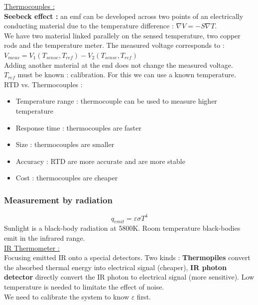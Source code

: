 \documentclass[../main.tex]{subfiles}
\begin{document}
\quad \underline{Thermocouples :}\\
\textbf{Seebeck effect :} an emf can be developed across two points of an electrically conducting material due to the temperature difference : $\nabla V = -S \nabla T$.\\
We have two material linked parallely on the sensed temperature, two copper rods and the temperature meter. The measured voltage corresponds to : $V_{meas} = V_1(T_{sense}, T_{ref}) - V_2 (T_{sense}, T_{ref})$\\ 
Adding another material at the end does not change the measured voltage.\\
$T_{ref}$ must be known : calibration. For this we can use a known temperature.\\

RTD vs. Thermocouples : \\
\begin{itemize}
    \item Temperature range : thermocouple can be used to measure higher temperature \\
    \item Response time : thermocouples are faster\\
    \item Size : thermocouples are smaller\\
    \item Accuracy : RTD are more accurate and are more stable\\
    \item Cost : thermocouples are cheaper\\
\end{itemize}

\subsubsection{Measurement by radiation}
\begin{equation}
    q_{emit} = \varepsilon \sigma T^4
\end{equation}
Sunlight is a black-body radiation at 5800K. Room temperature black-bodies emit in the infrared range.\\

\quad \underline{IR Thermometer :}\\
Focusing emitted IR onto a special detectors. Two kinds : \textbf{Thermopiles} convert the absorbed thermal energy into electrical signal (cheaper), \textbf{IR photon detector} directly convert the IR photon to electrical signal (more sensitive). Low temperature is needed to limitate the effect of noise.\\
We need to calibrate the system to know $\varepsilon$ first. \\
\end{document}
